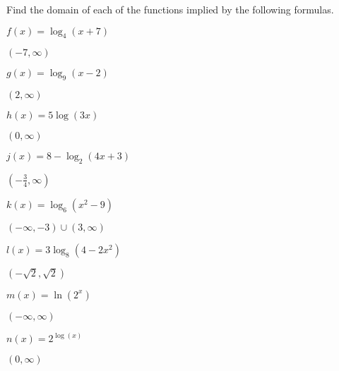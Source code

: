 \begin{exercises}
\begin{problem}[Domain]
Find the domain of each of the functions implied by the following formulas. 
\begin{multicols}{4}
	\begin{subproblem}
		$f(x)=\log_4(x+7)$ 
		\begin{shortsolution}
			$(-7,\infty)$
		\end{shortsolution}
	\end{subproblem}
	\begin{subproblem}
		$g(x)=\log_9(x-2)$ 
		\begin{shortsolution}
			$(2,\infty)$
		\end{shortsolution}
	\end{subproblem}
	\begin{subproblem}
		$h(x)=5\log(3x)$ 
		\begin{shortsolution}
			$(0,\infty)$
		\end{shortsolution}
	\end{subproblem}
	\begin{subproblem}
		$j(x)=8-\log_2(4x+3)$ 
		\begin{shortsolution}
			$\left( -\frac{3}{4},\infty \right)$
		\end{shortsolution}
	\end{subproblem}
	\begin{subproblem}
		$k(x)=\log_6(x^2-9)$ 
		\begin{shortsolution}
			$(-\infty,-3)\cup (3,\infty)$
		\end{shortsolution}
	\end{subproblem}
	\begin{subproblem}
		$l(x)=3\log_8(4-2x^2)$ 
		\begin{shortsolution}
			$(-\sqrt{2},\sqrt{2})$
		\end{shortsolution}
	\end{subproblem}
	\begin{subproblem}
		$m(x)=\ln(2^x)$ 
		\begin{shortsolution}
			$(-\infty,\infty)$
		\end{shortsolution}
	\end{subproblem}
	\begin{subproblem}
		$n(x)=2^{\log(x)}$ 
		\begin{shortsolution}
			$(0,\infty)$
		\end{shortsolution}

\end{subproblem}
\end{multicols}
\end{problem}
\end{exercises}
